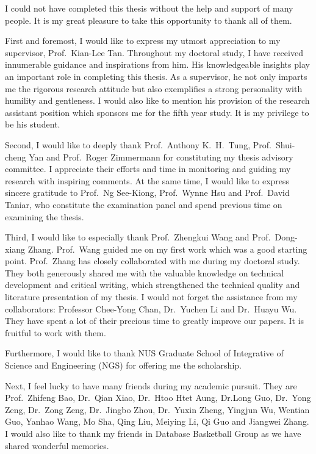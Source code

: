 \begin{acknowledgements}
I could not have completed this thesis without the help and support of many people.
It is my great pleasure to take this opportunity to thank all of them.
%

First and foremost, I would like to express my utmost appreciation to 
my supervisor, Prof.~Kian-Lee Tan. Throughout my doctoral study, I have
received innumerable guidance and inspirations from him. His knowledgeable
insights play an important role in completing this thesis. As
a supervisor, he not only imparts me the rigorous research attitude
but also exemplifies a strong personality with
humility and gentleness. 
I would also like to mention his provision of the research assistant position which
sponsors me for the fifth year study. It is my privilege to be his student.

Second, I would like to deeply thank Prof.~Anthony K.~H.~Tung, Prof.~Shui-cheng Yan 
and Prof.~Roger Zimmermann for constituting my thesis advisory committee. 
I appreciate their efforts and time in monitoring and guiding my research with
inspiring comments. At the same time, I would like to express sincere gratitude to Prof.~Ng See-Kiong, 
Prof.~Wynne Hsu and Prof.~David Taniar, who constitute the examination panel and spend previous time on
examining the thesis.


Third, I would like to especially thank Prof.~Zhengkui Wang and Prof.~Dong-xiang Zhang.
Prof.~Wang guided me on my first work which was a good starting point.
Prof.~Zhang has closely collaborated with me during my doctoral study. They
both generously shared me with the valuable knowledge on technical development 
and critical writing, which strengthened 
the technical quality and
literature presentation of my thesis.
I would not forget the assistance from my collaborators: Professor Chee-Yong Chan,
Dr.~Yuchen Li and Dr.~Huayu Wu. They have spent a lot of their precious time to greatly improve
our papers. It is fruitful to work with them.

Furthermore, I would like to thank NUS Graduate School of Integrative of Science and
Engineering (NGS) for offering me the scholarship.

Next, I feel lucky to have many friends during my academic
pursuit. They are Prof.~Zhifeng Bao, Dr.~Qian Xiao, Dr.~Htoo Htet Aung,
Dr.Long Guo, Dr.~Yong Zeng, Dr.~Zong Zeng, Dr.~Jingbo Zhou, Dr.~Yuxin Zheng, Yingjun Wu, Wentian Guo,
Yanhao Wang, Mo Sha, Qing Liu, Meiying Li, Qi Guo and Jiangwei Zhang. I would also 
like to thank my friends in Database Basketball Group %
as we have shared wonderful memories.


\end{acknowledgements}
